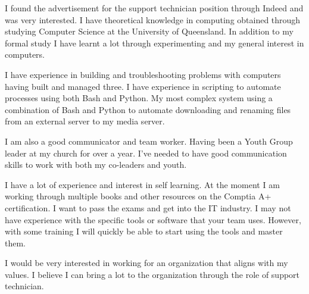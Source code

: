 \documentclass[11pt, a4paper]{awesome-cv} %
\begin{document}
\makecvheader %

\makelettertitle %


\begin{cvletter}


I found the advertisement for the support technician position through Indeed and was very interested. I have theoretical knowledge in computing obtained through studying Computer Science at the University of Queensland. In addition to my formal study I have learnt a lot through experimenting and my general interest in computers.

I have experience in building and troubleshooting problems with computers having built and managed three. I have experience in scripting to automate processes using both Bash and Python. My most complex system using a combination of Bash and Python to automate downloading and renaming files from an external server to my media server.

I am also a good communicator and team worker. Having been a Youth Group leader at my church for over a year. I've needed to have good communication skills to work with both my co-leaders and youth.

I have a lot of experience and interest in self learning. At the moment I am working through multiple books and other resources on the Comptia A+ certification. I want to pass the exams and get into the IT industry. I may not have experience with the specific tools or software that your team uses. However, with some training I will quickly be able to start using the tools and master them.

I would be very interested in working for an organization that aligns with my values. I believe I can bring a lot to the organization through the role of support technician.


\end{cvletter}


\makeletterclosing %
\end{document}
